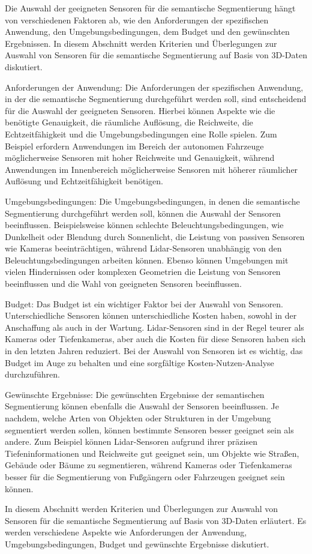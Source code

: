 Die Auswahl der geeigneten Sensoren für die semantische Segmentierung hängt von
verschiedenen Faktoren ab, wie den Anforderungen der spezifischen Anwendung,
den Umgebungsbedingungen, dem Budget und den gewünschten Ergebnissen. In diesem
Abschnitt werden Kriterien und Überlegungen zur Auswahl von Sensoren für die
semantische Segmentierung auf Basis von 3D-Daten diskutiert.

Anforderungen der Anwendung: Die Anforderungen der spezifischen Anwendung, in
der die semantische Segmentierung durchgeführt werden soll, sind entscheidend
für die Auswahl der geeigneten Sensoren. Hierbei können Aspekte wie die
benötigte Genauigkeit, die räumliche Auflösung, die Reichweite, die
Echtzeitfähigkeit und die Umgebungsbedingungen eine Rolle spielen. Zum Beispiel
erfordern Anwendungen im Bereich der autonomen Fahrzeuge möglicherweise
Sensoren mit hoher Reichweite und Genauigkeit, während Anwendungen im
Innenbereich möglicherweise Sensoren mit höherer räumlicher Auflösung und
Echtzeitfähigkeit benötigen.

Umgebungsbedingungen: Die Umgebungsbedingungen, in denen die semantische
Segmentierung durchgeführt werden soll, können die Auswahl der Sensoren
beeinflussen. Beispielsweise können schlechte Beleuchtungsbedingungen, wie
Dunkelheit oder Blendung durch Sonnenlicht, die Leistung von passiven Sensoren
wie Kameras beeinträchtigen, während Lidar-Sensoren unabhängig von den
Beleuchtungsbedingungen arbeiten können. Ebenso können Umgebungen mit vielen
Hindernissen oder komplexen Geometrien die Leistung von Sensoren beeinflussen
und die Wahl von geeigneten Sensoren beeinflussen.

Budget: Das Budget ist ein wichtiger Faktor bei der Auswahl von Sensoren.
Unterschiedliche Sensoren können unterschiedliche Kosten haben, sowohl in der
Anschaffung als auch in der Wartung. Lidar-Sensoren sind in der Regel teurer
als Kameras oder Tiefenkameras, aber auch die Kosten für diese Sensoren haben
sich in den letzten Jahren reduziert. Bei der Auswahl von Sensoren ist es
wichtig, das Budget im Auge zu behalten und eine sorgfältige
Kosten-Nutzen-Analyse durchzuführen.

Gewünschte Ergebnisse: Die gewünschten Ergebnisse der semantischen
Segmentierung können ebenfalls die Auswahl der Sensoren beeinflussen. Je
nachdem, welche Arten von Objekten oder Strukturen in der Umgebung segmentiert
werden sollen, können bestimmte Sensoren besser geeignet sein als andere. Zum
Beispiel können Lidar-Sensoren aufgrund ihrer präzisen Tiefeninformationen und
Reichweite gut geeignet sein, um Objekte wie Straßen, Gebäude oder Bäume zu
segmentieren, während Kameras oder Tiefenkameras besser für die Segmentierung
von Fußgängern oder Fahrzeugen geeignet sein können.

In diesem Abschnitt werden Kriterien und Überlegungen zur Auswahl von Sensoren
für die semantische Segmentierung auf Basis von 3D-Daten erläutert. Es werden
verschiedene Aspekte wie Anforderungen der Anwendung, Umgebungsbedingungen,
Budget und gewünschte Ergebnisse diskutiert.
